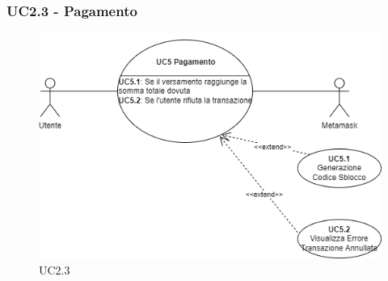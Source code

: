 \subsubsection{UC2.3 - Pagamento}

\begin{figure}[H]
    \centering
    \includegraphics[scale=0.7]{immagini/UseCases-UC5.png}
    \caption{UC2.3}
\end{figure}

